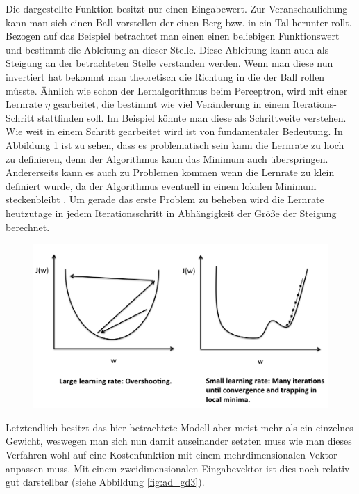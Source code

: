 Die dargestellte Funktion besitzt nur einen Eingabewert. Zur Veranschaulichung kann man sich einen Ball vorstellen der einen Berg bzw. in ein Tal herunter rollt. Bezogen auf das Beispiel betrachtet man einen einen beliebigen Funktionswert und bestimmt die Ableitung an dieser Stelle. Diese Ableitung kann auch als \glqq Steigung \grqq an der betrachteten Stelle verstanden werden. Wenn man diese nun invertiert hat bekommt man theoretisch die \glqq Richtung \grqq in die der Ball rollen müsste. Ähnlich wie schon der Lernalgorithmus beim Perceptron, wird mit einer Lernrate ${\eta}$ gearbeitet, die bestimmt wie viel Veränderung in einem Iterations-Schritt stattfinden soll. Im Beispiel könnte man diese als Schrittweite verstehen. 
Wie weit in einem Schritt gearbeitet wird ist von fundamentaler Bedeutung. In Abbildung \ref{fig:ad_gd2} ist zu sehen, dass es problematisch sein kann die Lernrate zu hoch zu definieren, denn der Algorithmus kann das Minimum auch überspringen. Andererseits kann es auch zu Problemen kommen wenn die Lernrate zu klein definiert wurde, da der Algorithmus eventuell in einem lokalen Minimum \glqq steckenbleibt \grqq . Um gerade das erste Problem zu beheben wird die Lernrate heutzutage in jedem Iterationsschritt in Abhängigkeit der Größe der Steigung berechnet.

\begin{figure}[!htb]
	\centering
	\includegraphics[width=\linewidth]{img/adeline_learning_rate}
	\label{fig:ad_gd2}
\end{figure}

Letztendlich besitzt das hier betrachtete Modell aber meist mehr als ein einzelnes Gewicht, weswegen man sich nun damit auseinander setzten muss wie man dieses Verfahren wohl auf eine Kostenfunktion mit einem mehrdimensionalen Vektor anpassen muss. Mit einem zweidimensionalen Eingabevektor ist dies noch relativ gut darstellbar (siehe Abbildung \ref{fig:ad_gd3}).

